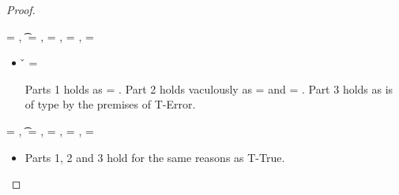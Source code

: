 \begin{lemma}
\begin{enumerate}
\begin{proof}
\begin{case}[T-Error]
  \e{} = ,
  \t{} = \Bot,
  \thenprop{\prop{}} = \botprop{}, \elseprop{\prop{}} = \botprop{}, \object{} = \emptyobject{}


  \begin{itemize}
    \item[]
      \begin{subcase}[BE-Error] 
        \v{} = 

        Parts 1 holds as \object{} = \emptyobject{}.
        Part 2 holds vaculously as \thenprop{\prop{}} = \botprop{} and \elseprop{\prop{}} = \botprop{}.
        Part 3 holds as  is of type \Bot by the premises of T-Error.
      \end{subcase}
  \end{itemize}
\end{case}

\begin{case}[T-Subsume]

\end{case}

\begin{case}[T-Const]\e{} = {\const{}},
  \t{} = {\constanttype{\const{}}},
{\thenprop{\prop{}}} = {\topprop{}},
{\elseprop{\prop{}}} = {\botprop{}},
{\object{}} = {\emptyobject{}}

  \begin{itemize}
    \item[] 
      \begin{subcase}[B-Val]
        Parts 1, 2 and 3 hold for the same reasons as T-True. 
      \end{subcase}
  \end{itemize}
\end{case}

\end{proof}

\end{enumerate}
\end{lemma}
